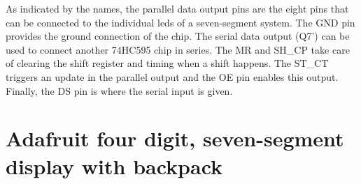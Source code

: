 As indicated by the names, the parallel data output pins are the eight pins that can be connected to the individual \acp{led} of a seven-segment system. The GND pin provides the ground connection of the chip. The serial data output (Q7') can be used to connect another 74HC595 chip in series. The MR and SH\_CP take care of clearing the shift register and timing when a shift happens. The ST\_CT triggers an update in the parallel output and the OE pin enables this output. Finally, the DS pin is where the serial input is given. 


\section{Adafruit four digit, seven-segment display with backpack}